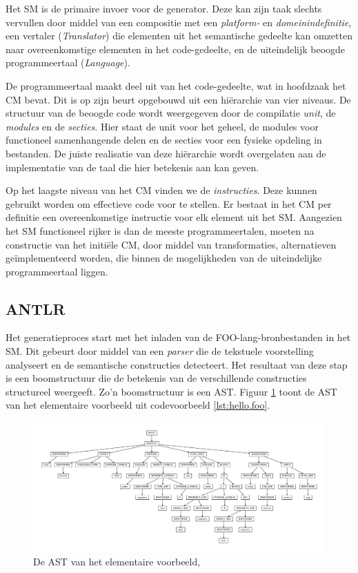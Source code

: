 Het SM is de primaire invoer voor de generator. Deze kan zijn taak slechts
vervullen door middel van een compositie met een \emph{platform-} en
\emph{domeinindefinitie}, een vertaler (\emph{Translator}) die elementen uit
het semantische gedeelte kan omzetten naar overeenkomstige elementen in het
code-gedeelte, en de uiteindelijk beoogde programmeertaal (\emph{Language}).

De programmeertaal maakt deel uit van het code-gedeelte, wat in hoofdzaak het
CM bevat. Dit is op zijn beurt opgebouwd uit een hi\"erarchie van vier niveaus.
De structuur van de beoogde code wordt weergegeven door de compilatie
\emph{unit}, de \emph{modules} en de \emph{secties}. Hier staat de unit voor
het geheel, de modules voor functioneel samenhangende delen en de secties voor
een fysieke opdeling in bestanden. De juiste realisatie van deze hi\"erarchie
wordt overgelaten aan de implementatie van de taal die hier betekenis aan kan
geven.

Op het laagste niveau van het CM vinden we de \emph{instructies}. Deze kunnen
gebruikt worden om effectieve code voor te stellen. Er bestaat in het CM per
definitie een overeenkomstige instructie voor elk element uit het SM. Aangezien
het SM functioneel rijker is dan de meeste programmeertalen, moeten na
constructie van het initi\"ele CM, door middel van transformaties,
alternatieven ge\"implementeerd worden, die binnen de mogelijkheden van de
uiteindelijke programmeertaal liggen.

\subsection{ANTLR}
\label{subsection:devel-antlr}

Het generatieproces start met het inladen van de FOO-lang-bronbestanden in het
SM. Dit gebeurt door middel van een \emph{parser} die de tekstuele voorstelling
analyseert en de semantische constructies detecteert. Het resultaat van deze
stap is een boomstructuur die de betekenis van de verschillende constructies
structureel weergeeft. Zo'n boomstructuur is een AST. Figuur
\ref{fig:devel-ast} toont de AST van het elementaire voorbeeld uit
codevoorbeeld \ref{lst:hello.foo}.

\begin{figure}[ht]
  \centering
  \includegraphics[width=\linewidth]{resources/hello_ast.pdf}
  \caption{De AST van het elementaire voorbeeld, }
  \label{fig:devel-ast}
\end{figure}

